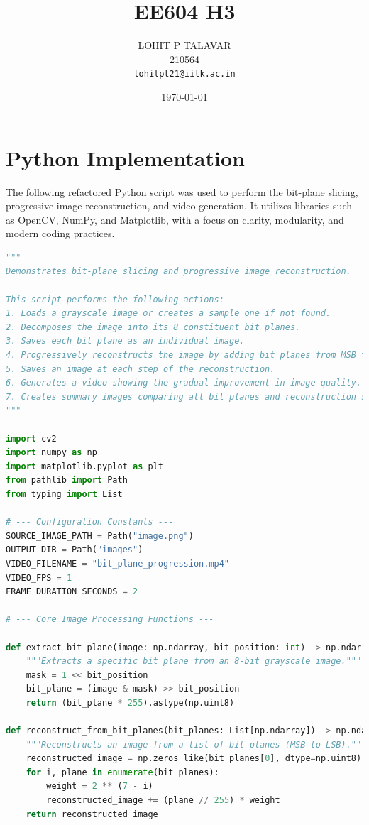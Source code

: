 \documentclass{article}
\title{EE604 H3}
\author{LOHIT P TALAVAR \\ 210564 \\ \texttt{lohitpt21@iitk.ac.in}}
\date{\today}
\begin{document}
\maketitle
\thispagestyle{empty}
\newpage

\tableofcontents
\newpage


\section{Python Implementation}
The following refactored Python script was used to perform the bit-plane slicing, progressive image reconstruction, and video generation. It utilizes libraries such as OpenCV, NumPy, and Matplotlib, with a focus on clarity, modularity, and modern coding practices.

\begin{lstlisting}[language=Python, caption={Rewritten Python script for bit-plane slicing and reconstruction.}, label={lst:code}]
"""
Demonstrates bit-plane slicing and progressive image reconstruction.

This script performs the following actions:
1. Loads a grayscale image or creates a sample one if not found.
2. Decomposes the image into its 8 constituent bit planes.
3. Saves each bit plane as an individual image.
4. Progressively reconstructs the image by adding bit planes from MSB to LSB.
5. Saves an image at each step of the reconstruction.
6. Generates a video showing the gradual improvement in image quality.
7. Creates summary images comparing all bit planes and reconstruction steps.
"""

import cv2
import numpy as np
import matplotlib.pyplot as plt
from pathlib import Path
from typing import List

# --- Configuration Constants ---
SOURCE_IMAGE_PATH = Path("image.png")
OUTPUT_DIR = Path("images")
VIDEO_FILENAME = "bit_plane_progression.mp4"
VIDEO_FPS = 1
FRAME_DURATION_SECONDS = 2

# --- Core Image Processing Functions ---

def extract_bit_plane(image: np.ndarray, bit_position: int) -> np.ndarray:
    """Extracts a specific bit plane from an 8-bit grayscale image."""
    mask = 1 << bit_position
    bit_plane = (image & mask) >> bit_position
    return (bit_plane * 255).astype(np.uint8)

def reconstruct_from_bit_planes(bit_planes: List[np.ndarray]) -> np.ndarray:
    """Reconstructs an image from a list of bit planes (MSB to LSB)."""
    reconstructed_image = np.zeros_like(bit_planes[0], dtype=np.uint8)
    for i, plane in enumerate(bit_planes):
        weight = 2 ** (7 - i)
        reconstructed_image += (plane // 255) * weight
    return reconstructed_image


\end{lstlisting}
\end{document}
